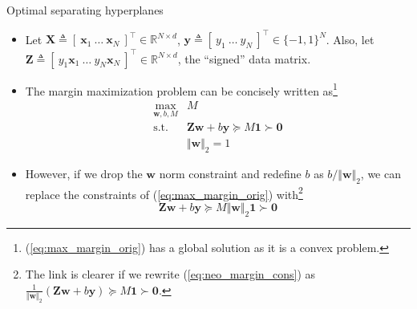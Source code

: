 \documentclass{beamer}
\numberwithin{equation}{section}
\newcommand{\aref}[1]{\alert{\ref{#1}}}
\begin{document}
\begin{frame}{Optimal separating hyperplanes}
    \begin{itemize}
        \item
        Let $ \mathbf{X} \triangleq [ \ \mathbf{x}_1 \ \ldots \
        \mathbf{x}_N \ ]^\top \in \mathbb{R}^{N \times d} $,
        $ \mathbf{y} \triangleq [ \ y_1 \ \ldots \ y_N \ ]^\top \in
        \{-1, 1\}^N $. Also, let $ \mathbf{Z} \triangleq [ \ y_1\mathbf{x}_1 \
        \ldots \ y_N\mathbf{x}_N \ ]^\top \in \mathbb{R}^{N \times d} $,
        the ``signed'' data matrix.

        \item
        The margin maximization problem can be concisely written as\footnote{
            (\aref{eq:max_margin_orig}) has a global solution as it is a convex
            problem.        
        }
        \begin{equation} \label{eq:max_margin_orig}
            \begin{array}{ll}
                \displaystyle\max_{\mathbf{w}, b, M} & M \\
                \text{s.t.} &
                \mathbf{Z}\mathbf{w} + b\mathbf{y} \succeq M\mathbf{1}
                \succ \mathbf{0} \\
                & \Vert\mathbf{w}\Vert_2 = 1
            \end{array}
        \end{equation}

        \item
        However, if we drop the $ \mathbf{w} $ norm constraint and redefine
        $ b $ as $ b / \Vert\mathbf{w}\Vert_2 $, we can replace the constraints
        of (\aref{eq:max_margin_orig}) with\footnote{
            The link is clearer if we rewrite (\aref{eq:neo_margin_cons}) as
            $ \frac{1}{\Vert\mathbf{w}\Vert_2}(\mathbf{Zw} + b\mathbf{y})
            \succeq M\mathbf{1} \succ \mathbf{0} $. %
            \vspace{0.01 pt}
        } \cite{esl}
        \begin{equation} \label{eq:neo_margin_cons}
            \mathbf{Zw} + b\mathbf{y} \succeq M\Vert\mathbf{w}\Vert_2\mathbf{1}
            \succ \mathbf{0}
        \end{equation}
    \end{itemize}
\end{frame}
\end{document}
